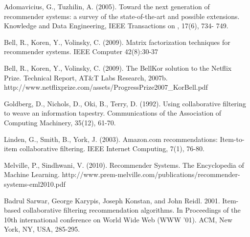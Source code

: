 \documentclass[letterpaper, 10 pt, twocolumn]{article}
\begin{document}
\begin{thebibliography}{99}

Adomavicius, G., Tuzhilin, A. (2005). Toward the next generation of recommender systems: a survey of the state-of-the-art and possible extensions. Knowledge and Data Engineering, IEEE Transactions on , 17(6),  734- 749.

Bell, R., Koren, Y., Volinsky, C. (2009). Matrix factorization techniques for recommender systems. IEEE Computer 42(8):30-37

Bell, R., Koren, Y., Volinsky, C. (2009). 
The BellKor solution to the Netﬂix Prize. Technical Report, AT\&T Labs 
Research, 2007b. 
http://www.netflixprize.com/assets/ProgressPrize2007\_KorBell.pdf


Goldberg, D., Nichols, D., Oki, B., Terry, D. (1992). 
Using collaborative filtering to weave an information tapestry. 
Communications of the Association of Computing Machinery, 35(12), 61-70.

Linden, G., Smith, B., York, J. (2003). Amazon.com recommendations: Item-to-item collaborative filtering. IEEE Internet
Computing, 7(1), 76-80.

Melville, P., Sindhwani, V. (2010).
Recommender Systems. The Encyclopedia of Machine Learning. 
http://www.prem-melville.com/publications/recommender-systems-eml2010.pdf

Badrul Sarwar, George Karypis, Joseph Konstan, and John Reidl. 2001.
Item-based collaborative filtering recommendation algorithms.
In Proceedings of the 10th international conference on World Wide Web (WWW '01). ACM, New York, NY, USA, 285-295. 

\end{thebibliography}
\end{document}
